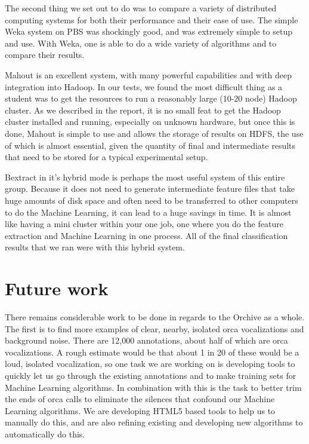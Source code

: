The second thing we set out to do was to compare a variety of
distributed computing systems for both their performance and their
ease of use.  The simple Weka system on PBS was shockingly good, and
was extremely simple to setup and use.  With Weka, one is able to do a
wide variety of algorithms and to compare their results.  

Mahout is an excellent system, with many powerful capabilities and
with deep integration into Hadoop.  In our tests, we found the most
difficult thing as a student was to get the resources to run a
reasonably large (10-20 node) Hadoop cluster.  As we described in the
report, it is no small feat to get the Hadoop cluster installed and
running, especially on unknown hardware, but once this is done, Mahout
is simple to use and allows the storage of results on HDFS, the use of
which is almost essential, given the quantity of final and
intermediate results that need to be stored for a typical experimental
setup.  

Bextract in it's hybrid mode is perhaps the most useful system of this
entire group.  Because it does not need to generate intermediate
feature files that take huge amounts of disk space and often need to
be transferred to other computers to do the Machine Learning, it can
lead to a huge savings in time.  It is almost like having a mini
cluster within your one job, one where you do the feature extraction
and Machine Learning in one process.  All of the final classification
results that we ran were with this hybrid system.



\section{Future work}

There remains considerable work to be done in regards to the Orchive
as a whole.  The first is to find more examples of clear, nearby,
isolated orca vocalizations and background noise.  There are 12,000
annotations, about half of which are orca vocalizations.  A rough
estimate would be that about 1 in 20 of these would be a loud,
isolated vocalization, so one task we are working on is developing
tools to quickly let us go through the existing annotations and to
make training sets for Machine Learning algorithms.  In combination
with this is the task to better trim the ends of orca calls to
eliminate the silences that confound our Machine Learning algorithms.
We are developing HTML5 based tools to help us to manually do this,
and are also refining existing and developing new algorithms to
automatically do this.

